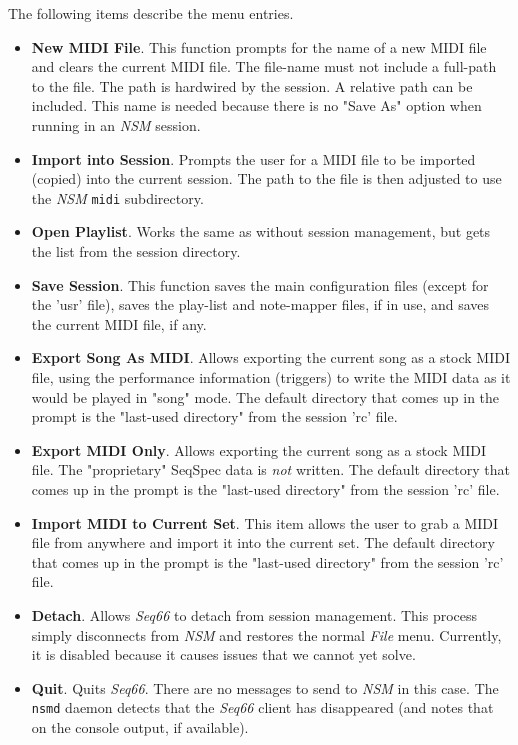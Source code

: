    The following items describe the menu entries.

   \begin{itemize}
      \item \textbf{New MIDI File}.
         This function prompts for the name of a
         new MIDI file and clears the current MIDI file.  The file-name must not
         include a full-path to the file.  The path is hardwired by the
         session.  A relative path can be included.  This name is needed
         because there is no "Save As" option when running in an \textsl{NSM}
         session.
      \item \textbf{Import into Session}.
         Prompts the user for a MIDI file to
         be imported (copied) into the current session.  The path to the file
         is then adjusted to use the \textsl{NSM} \texttt{midi} subdirectory.
      \item \textbf{Open Playlist}.
         Works the same as without session
         management, but gets the list from the session directory.
      \item \textbf{Save Session}.
         This function saves the main configuration
         files (except for the 'usr' file), saves the play-list and note-mapper
         files, if in use, and saves the current MIDI file, if any.
      \item \textbf{Export Song As MIDI}.
         Allows exporting the current song as a stock MIDI file, using the
         performance information (triggers) to write the MIDI data as it would
         be played in "song" mode.
         The default directory that comes up in the
         prompt is the "last-used directory" from the session 'rc' file.
      \item \textbf{Export MIDI Only}.
         Allows exporting the current song as a stock MIDI file.
         The "proprietary" SeqSpec data is \textsl{not} written.
         The default directory that comes up in the
         prompt is the "last-used directory" from the session 'rc' file.
      \item \textbf{Import MIDI to Current Set}.
         This item allows the user to grab a MIDI file from anywhere and import
         it into the current set.
         The default directory that comes up in the
         prompt is the "last-used directory" from the session 'rc' file.
      \item \textbf{Detach}.
         Allows \textsl{Seq66} to detach from session management.
         This process simply disconnects from \textsl{NSM} and restores the
         normal \textsl{File} menu.
         Currently, it is disabled because it causes issues that we cannot yet
         solve.
      \item \textbf{Quit}.
         Quits \textsl{Seq66}.
         There are no messages to send to \textsl{NSM} in this case.
         The \texttt{nsmd} daemon detects that the \textsl{Seq66} client has
         disappeared (and notes that on the console output, if available).
   \end{itemize}

